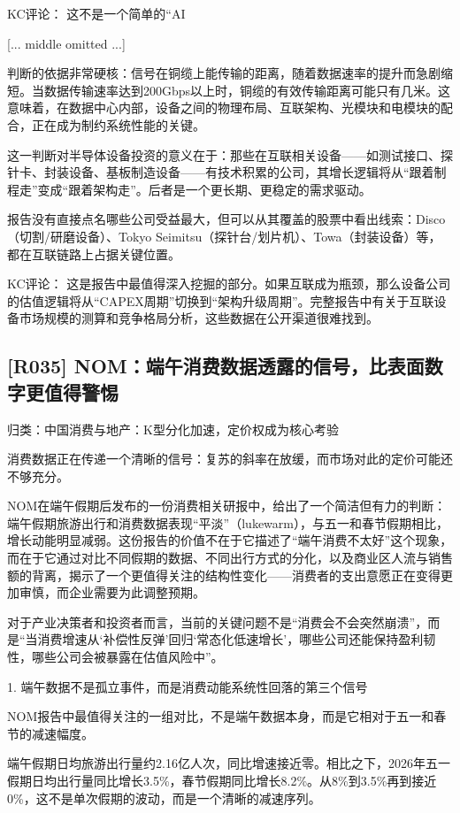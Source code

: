 \documentclass[11pt]{ctexart}
\begin{document}
KC评论： 这不是一个简单的“AI

[... middle omitted ...]

判断的依据非常硬核：信号在铜缆上能传输的距离，随着数据速率的提升而急剧缩短。当数据传输速率达到200Gbps以上时，铜缆的有效传输距离可能只有几米。这意味着，在数据中心内部，设备之间的物理布局、互联架构、光模块和电模块的配合，正在成为制约系统性能的关键。

这一判断对半导体设备投资的意义在于：那些在互联相关设备——如测试接口、探针卡、封装设备、基板制造设备——有技术积累的公司，其增长逻辑将从“跟着制程走”变成“跟着架构走”。后者是一个更长期、更稳定的需求驱动。

报告没有直接点名哪些公司受益最大，但可以从其覆盖的股票中看出线索：Disco（切割/研磨设备）、Tokyo Seimitsu（探针台/划片机）、Towa（封装设备）等，都在互联链路上占据关键位置。

KC评论： 这是报告中最值得深入挖掘的部分。如果互联成为瓶颈，那么设备公司的估值逻辑将从“CAPEX周期”切换到“架构升级周期”。完整报告中有关于互联设备市场规模的测算和竞争格局分析，这些数据在公开渠道很难找到。

\subsection{[R035] NOM：端午消费数据透露的信号，比表面数字更值得警惕}
{\small\color{refgray}归类：中国消费与地产：K型分化加速，定价权成为核心考验}

消费数据正在传递一个清晰的信号：复苏的斜率在放缓，而市场对此的定价可能还不够充分。

NOM在端午假期后发布的一份消费相关研报中，给出了一个简洁但有力的判断：端午假期旅游出行和消费数据表现“平淡”（lukewarm），与五一和春节假期相比，增长动能明显减弱。这份报告的价值不在于它描述了“端午消费不太好”这个现象，而在于它通过对比不同假期的数据、不同出行方式的分化，以及商业区人流与销售额的背离，揭示了一个更值得关注的结构性变化——消费者的支出意愿正在变得更加审慎，而企业需要为此调整预期。

对于产业决策者和投资者而言，当前的关键问题不是“消费会不会突然崩溃”，而是“当消费增速从‘补偿性反弹’回归‘常态化低速增长’，哪些公司还能保持盈利韧性，哪些公司会被暴露在估值风险中”。

1. 端午数据不是孤立事件，而是消费动能系统性回落的第三个信号

NOM报告中最值得关注的一组对比，不是端午数据本身，而是它相对于五一和春节的减速幅度。

端午假期日均旅游出行量约2.16亿人次，同比增速接近零。相比之下，2026年五一假期日均出行量同比增长3.5\%，春节假期同比增长8.2\%。从8\%到3.5\%再到接近0\%，这不是单次假期的波动，而是一个清晰的减速序列。
\end{document}
